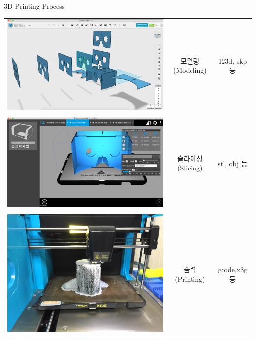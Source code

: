 \documentclass[11pt]{beamer}
\begin{document}
\begin{frame}[t]{3D Printing Process}\footnotesize
\begin{tabular}{c c c}
\includegraphics[width=0.4\textheight]{./image/09_01.png}&모델링(Modeling)&123d, skp 등\\ &&\\
\includegraphics[width=0.4\textheight]{./image/09_02.png}&슬라이싱(Slicing)&stl, obj 등\\ &&\\
\includegraphics[width=0.4\textheight]{./image/09_03.jpg}&출력(Printing)&gcode,x3g 등
\end{tabular}
\end{frame}
\end{document}
